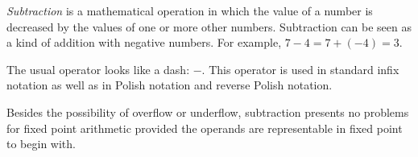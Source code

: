 \documentclass[12pt]{article}
\begin{document}
{\em Subtraction} is a mathematical operation in which the value of a number is decreased by the values of one or more other numbers. Subtraction can be seen as a kind of addition with negative numbers. For example, $7 - 4 = 7 + (-4) = 3$.

The usual operator looks like a dash: $-$. This operator is used in standard infix notation as well as in Polish notation and reverse Polish notation.

Besides the possibility of overflow or underflow, subtraction presents no problems for fixed point arithmetic provided the operands are representable in fixed point to begin with.
\end{document}
